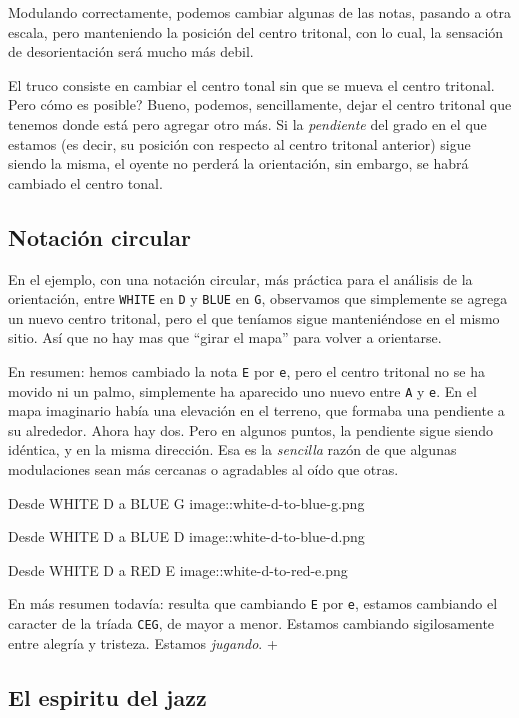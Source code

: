 \documentclass[]{article}
\begin{document}
Modulando correctamente, podemos cambiar algunas de las notas, pasando a otra escala, pero manteniendo la posición del centro tritonal, con lo cual, la sensación de desorientación será mucho más debil.

El truco consiste en cambiar el centro tonal sin que se mueva el centro tritonal. Pero cómo es posible? Bueno, podemos, sencillamente, dejar el centro tritonal que tenemos donde está pero agregar otro más. Si la \emph{pendiente} del grado en el que estamos (es decir, su posición con respecto al centro tritonal anterior) sigue siendo la misma, el oyente no perderá la orientación, sin embargo, se habrá cambiado el centro tonal.

\subsection{Notación circular}

En el ejemplo, con una notación circular, más práctica para el análisis de la orientación, entre \texttt{WHITE} en \texttt{D} y \texttt{BLUE} en \texttt{G}, observamos que simplemente se agrega un nuevo centro tritonal, pero el que teníamos sigue manteniéndose en el mismo sitio. Así que no hay mas que ``girar el mapa'' para volver a orientarse.

En resumen: hemos cambiado la nota \texttt{E} por \texttt{e}, pero el centro tritonal no se ha movido ni un palmo, simplemente ha aparecido uno nuevo entre \texttt{A} y \texttt{e}. En el mapa imaginario había una elevación en el terreno, que formaba una pendiente a su alrededor. Ahora hay dos. Pero en algunos puntos, la pendiente sigue siendo idéntica, y en la misma dirección. Esa es la \emph{sencilla} razón de que algunas modulaciones sean más cercanas o agradables al oído que otras.

Desde WHITE D a BLUE G image::white-d-to-blue-g.png

Desde WHITE D a BLUE D image::white-d-to-blue-d.png

Desde WHITE D a RED E image::white-d-to-red-e.png

En más resumen todavía: resulta que cambiando \texttt{E} por \texttt{e}, estamos cambiando el caracter de la tríada \texttt{CEG}, de mayor a menor. Estamos cambiando sigilosamente entre alegría y tristeza. Estamos \emph{jugando}. +

\subsection{El espiritu del jazz}
\end{document}

